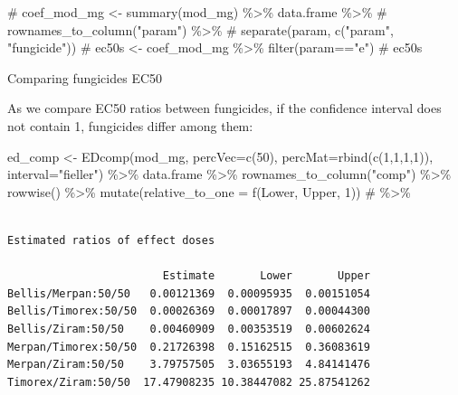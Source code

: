 \documentclass[
  letterpaper,
  DIV=11,
  numbers=noendperiod]{scrreport}
\newenvironment{Shaded}{\begin{snugshade}}{\end{snugshade}}
\newcommand{\AttributeTok}[1]{\textcolor[rgb]{0.40,0.45,0.13}{#1}}
\newcommand{\CommentTok}[1]{\textcolor[rgb]{0.37,0.37,0.37}{#1}}
\newcommand{\DecValTok}[1]{\textcolor[rgb]{0.68,0.00,0.00}{#1}}
\newcommand{\FunctionTok}[1]{\textcolor[rgb]{0.28,0.35,0.67}{#1}}
\newcommand{\NormalTok}[1]{\textcolor[rgb]{0.00,0.23,0.31}{#1}}
\newcommand{\OtherTok}[1]{\textcolor[rgb]{0.00,0.23,0.31}{#1}}
\newcommand{\SpecialCharTok}[1]{\textcolor[rgb]{0.37,0.37,0.37}{#1}}
\newcommand{\StringTok}[1]{\textcolor[rgb]{0.13,0.47,0.30}{#1}}
\begin{document}
\begin{Shaded}
\begin{Highlighting}[]
\CommentTok{\# coef\_mod\_mg \textless{}{-} summary(mod\_mg) \%\textgreater{}\% data.frame \%\textgreater{}\% }
\CommentTok{\#   rownames\_to\_column("param")  \%\textgreater{}\% }
\CommentTok{\#   separate(param, c("param", "fungicide"))}
\CommentTok{\# ec50s \textless{}{-} coef\_mod\_mg \%\textgreater{}\% filter(param=="e") }
\CommentTok{\# ec50s}
\end{Highlighting}
\end{Shaded}

Comparing fungicides EC50

As we compare EC50 ratios between fungicides, if the confidence interval
does not contain 1, fungicides differ among them:

\begin{Shaded}
\begin{Highlighting}[]
\NormalTok{ed\_comp }\OtherTok{\textless{}{-}} \FunctionTok{EDcomp}\NormalTok{(mod\_mg, }
                  \AttributeTok{percVec=}\FunctionTok{c}\NormalTok{(}\DecValTok{50}\NormalTok{), }
                  \AttributeTok{percMat=}\FunctionTok{rbind}\NormalTok{(}\FunctionTok{c}\NormalTok{(}\DecValTok{1}\NormalTok{,}\DecValTok{1}\NormalTok{,}\DecValTok{1}\NormalTok{,}\DecValTok{1}\NormalTok{)), }
                  \AttributeTok{interval=}\StringTok{"fieller"}\NormalTok{) }\SpecialCharTok{\%\textgreater{}\%} 
\NormalTok{      data.frame }\SpecialCharTok{\%\textgreater{}\%} 
  \FunctionTok{rownames\_to\_column}\NormalTok{(}\StringTok{"comp"}\NormalTok{) }\SpecialCharTok{\%\textgreater{}\%}
  \FunctionTok{rowwise}\NormalTok{() }\SpecialCharTok{\%\textgreater{}\%} 
  \FunctionTok{mutate}\NormalTok{(}\AttributeTok{relative\_to\_one =} \FunctionTok{f}\NormalTok{(Lower, Upper, }\DecValTok{1}\NormalTok{)) }\CommentTok{\# \%\textgreater{}\% }
\end{Highlighting}
\end{Shaded}

\begin{verbatim}

Estimated ratios of effect doses

                        Estimate       Lower       Upper
Bellis/Merpan:50/50   0.00121369  0.00095935  0.00151054
Bellis/Timorex:50/50  0.00026369  0.00017897  0.00044300
Bellis/Ziram:50/50    0.00460909  0.00353519  0.00602624
Merpan/Timorex:50/50  0.21726398  0.15162515  0.36083619
Merpan/Ziram:50/50    3.79757505  3.03655193  4.84141476
Timorex/Ziram:50/50  17.47908235 10.38447082 25.87541262
\end{verbatim}
\end{document}
